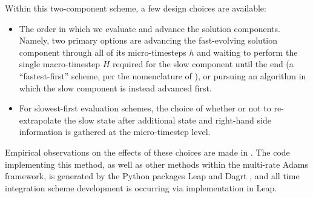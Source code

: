 Within this two-component scheme, a few design choices are available:
\begin{itemize}
\item The order in which we evaluate and advance the solution components.
	Namely, two primary options are advancing the fast-evolving solution
	component through all of its micro-timesteps $h$ and waiting to perform
	the single macro-timestep $H$ required for the slow component until the
	end (a ``fastest-first'' scheme, per the nomenclature of
	\cite{gear1984multirate}), or pursuing an algorithm in which the slow
	component is instead advanced first.
\item For slowest-first evaluation schemes, the choice of whether or not to
	re-extrapolate the slow state after additional state and right-hand
	side information is gathered at the micro-timestep level.
\end{itemize}
Empirical observations on the effects of these choices are made
in \cite{klockner2010high}. The code implementing this method, as well as other methods
within the multi-rate Adams framework, is generated by the Python packages 
Leap \cite{Leap2020} and Dagrt \cite{Dagrt2020}, and all time integration scheme
development is occurring via implementation in Leap.
